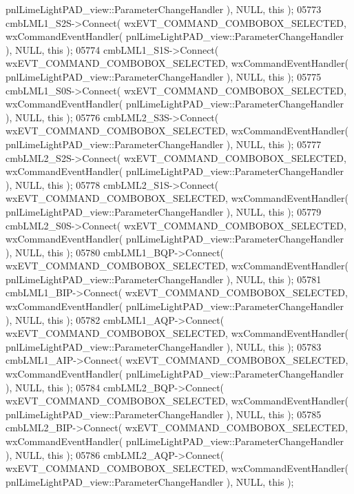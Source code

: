 \begin{DoxyCode}
      pnlLimeLightPAD_view::ParameterChangeHandler ), NULL, \textcolor{keyword}{this} );
05773     cmbLML1_S2S->Connect( wxEVT\_COMMAND\_COMBOBOX\_SELECTED, wxCommandEventHandler( 
      pnlLimeLightPAD_view::ParameterChangeHandler ), NULL, \textcolor{keyword}{this} );
05774     cmbLML1_S1S->Connect( wxEVT\_COMMAND\_COMBOBOX\_SELECTED, wxCommandEventHandler( 
      pnlLimeLightPAD_view::ParameterChangeHandler ), NULL, \textcolor{keyword}{this} );
05775     cmbLML1_S0S->Connect( wxEVT\_COMMAND\_COMBOBOX\_SELECTED, wxCommandEventHandler( 
      pnlLimeLightPAD_view::ParameterChangeHandler ), NULL, \textcolor{keyword}{this} );
05776     cmbLML2_S3S->Connect( wxEVT\_COMMAND\_COMBOBOX\_SELECTED, wxCommandEventHandler( 
      pnlLimeLightPAD_view::ParameterChangeHandler ), NULL, \textcolor{keyword}{this} );
05777     cmbLML2_S2S->Connect( wxEVT\_COMMAND\_COMBOBOX\_SELECTED, wxCommandEventHandler( 
      pnlLimeLightPAD_view::ParameterChangeHandler ), NULL, \textcolor{keyword}{this} );
05778     cmbLML2_S1S->Connect( wxEVT\_COMMAND\_COMBOBOX\_SELECTED, wxCommandEventHandler( 
      pnlLimeLightPAD_view::ParameterChangeHandler ), NULL, \textcolor{keyword}{this} );
05779     cmbLML2_S0S->Connect( wxEVT\_COMMAND\_COMBOBOX\_SELECTED, wxCommandEventHandler( 
      pnlLimeLightPAD_view::ParameterChangeHandler ), NULL, \textcolor{keyword}{this} );
05780     cmbLML1_BQP->Connect( wxEVT\_COMMAND\_COMBOBOX\_SELECTED, wxCommandEventHandler( 
      pnlLimeLightPAD_view::ParameterChangeHandler ), NULL, \textcolor{keyword}{this} );
05781     cmbLML1_BIP->Connect( wxEVT\_COMMAND\_COMBOBOX\_SELECTED, wxCommandEventHandler( 
      pnlLimeLightPAD_view::ParameterChangeHandler ), NULL, \textcolor{keyword}{this} );
05782     cmbLML1_AQP->Connect( wxEVT\_COMMAND\_COMBOBOX\_SELECTED, wxCommandEventHandler( 
      pnlLimeLightPAD_view::ParameterChangeHandler ), NULL, \textcolor{keyword}{this} );
05783     cmbLML1_AIP->Connect( wxEVT\_COMMAND\_COMBOBOX\_SELECTED, wxCommandEventHandler( 
      pnlLimeLightPAD_view::ParameterChangeHandler ), NULL, \textcolor{keyword}{this} );
05784     cmbLML2_BQP->Connect( wxEVT\_COMMAND\_COMBOBOX\_SELECTED, wxCommandEventHandler( 
      pnlLimeLightPAD_view::ParameterChangeHandler ), NULL, \textcolor{keyword}{this} );
05785     cmbLML2_BIP->Connect( wxEVT\_COMMAND\_COMBOBOX\_SELECTED, wxCommandEventHandler( 
      pnlLimeLightPAD_view::ParameterChangeHandler ), NULL, \textcolor{keyword}{this} );
05786     cmbLML2_AQP->Connect( wxEVT\_COMMAND\_COMBOBOX\_SELECTED, wxCommandEventHandler( 
      pnlLimeLightPAD_view::ParameterChangeHandler ), NULL, \textcolor{keyword}{this} );

\end{DoxyCode}
